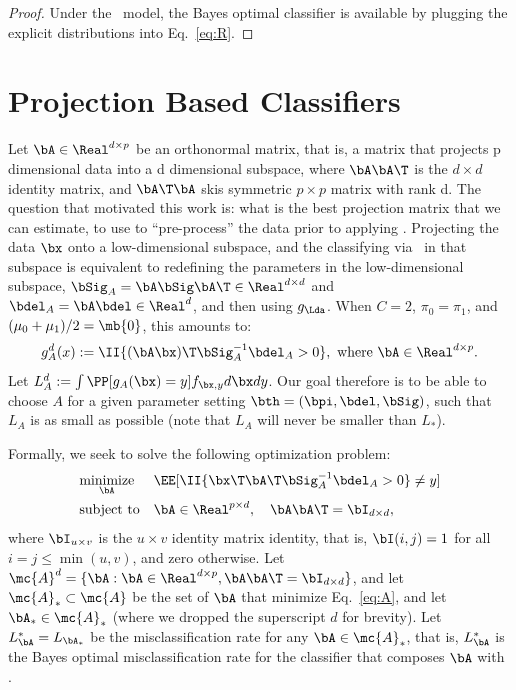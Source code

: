 \documentclass[10pt]{article}
\begin{document}
\begin{proof}
Under the \Lda~model, the Bayes optimal classifier is available by plugging the explicit distributions into Eq.~\eqref{eq:R}.
\end{proof}




\section{Projection Based Classifiers}


Let $\bA \in \Real^{d \times p}$ be an orthonormal matrix, that is, a matrix that projects p dimensional data into a d dimensional subspace, where $\bA\bA\T$ is the $d \times d$ identity matrix, and $\bA\T \bA$ skis symmetric $p \times p$ matrix with rank d.   The question that motivated this work is: what is the best projection matrix that we can estimate, to use to ``pre-process'' the data prior to applying \Lda.  
Projecting the data $\bx$ onto a low-dimensional subspace, and the classifying via \Lda~in that subspace is equivalent to redefining the parameters in the low-dimensional subspace, 
$\bSig_A=\bA \bSig \bA\T \in \Real^{d \times d}$ and $\bdel_A = \bA \bdel \in \Real^d$, and then using $g_{\Lda}$.  When $C=2$, $\pi_0=\pi_1$, and $(\mu_0+\mu_1)/2=\mb{0}$, this amounts to:
\begin{align} \label{eq:g_A}
g^d_A(x) := \II \{ (\bA \bx)\T \bSig^{-1}_A \bdel_A > 0\}, \text{ where } \bA \in \Real^{d \times p}.
\end{align}
Let $L^d_A :=\int \PP[g_A(\bx)=y] f_{\bx,y} d\bx dy$.
Our goal therefore is to be able to choose $A$ for a given parameter setting $\bth=(\bpi, \bdel,\bSig)$, such that $L_A$ is as small as possible (note that $L_A$ will never be smaller than $L_*$).  

Formally, we seek to solve the following optimization problem:
\begin{equation} \label{eq:A}
\begin{aligned}
& \underset{\bA}{\text{minimize}}
& & \EE [ \II \{ \bx\T \bA\T \bSig^{-1}_A \bdel_A > 0\} \neq y] \\
& \text{subject to} & & \bA \in \Real^{p \times d}, \quad \bA \bA\T = \bI_{d \times d},
\end{aligned}
\end{equation}
where $\bI_{u \times v}$ is the $u \times v$ identity matrix identity, that is, $\bI(i,j)=1$ for all $i=j \leq \min(u,v)$, and zero otherwise. 
Let $\mc{A}^d=\{\bA : \bA \in \Real^{d \times p}, \bA \bA\T = \bI_{d \times d}\}$, and let $\mc{A}_* \subset \mc{A}$ be the set of $\bA$  that minimize Eq.~\eqref{eq:A}, and let $\bA_* \in \mc{A}_*$ (where we dropped the superscript $d$ for brevity).   Let $L_{\bA}^*=L_{\bA_*}$ be the misclassification rate for any $\bA \in \mc{A}_*$, that is, $L_{\bA}^*$ is the Bayes optimal misclassification rate for the classifier that composes $\bA$ with \Lda.
\end{document}

